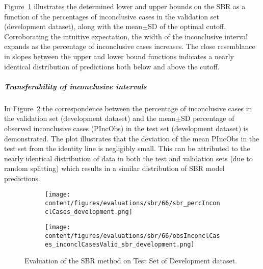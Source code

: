 Figure~\ref{fig:sbr_percInconclCases_development} illustrates the determined lower and upper bounds on the SBR 
as a function of the percentages of inconclusive cases in the validation set (development dataset), 
along with the mean$\pm$SD of the optimal cutoff.
Corroborating the intuitive expectation, the width of the inconclusive interval expands 
as the percentage of inconclusive cases increases.
The close resemblance in slopes between the upper and lower bound functions 
indicates a nearly identical distribution of predictions both below and above the cutoff.

\subparagraph{Transferability of inconclusive intervals}

In Figure~\ref{fig:obsInconclCases_inconclCasesValid_sbr_development} the correspondence between 
the percentage of inconclusive cases in the validation set (development dataset) and 
the mean$\pm$SD percentage of observed inconclusive cases (PIncObs) in the test set (development dataset) is demonstrated.
The plot illustrates that the deviation of the mean PIncObs in the test set from the 
identity line is negligibly small.
This can be attributed to the nearly identical distribution of data in both the test and validation sets 
(due to random splitting) which results in a similar distribution of SBR model predictions.


\begin{figure}[ht]
  \begin{subfigure}{0.48\textwidth}
    \centering
    \texttt{[image: content/figures/evaluations/sbr/66/sbr\_percInconclCases\_development.png]}
    \label{fig:sbr_percInconclCases_development}
  \end{subfigure}
  \hfill
  \begin{subfigure}{0.495\textwidth}
    \centering
    \texttt{[image: content/figures/evaluations/sbr/66/obsInconclCases\_inconclCasesValid\_sbr\_development.png]}
    \label{fig:obsInconclCases_inconclCasesValid_sbr_development}
  \end{subfigure}

  \caption{Evaluation of the SBR method on Test Set of Development dataset.}
  \label{fig:}
\end{figure}

